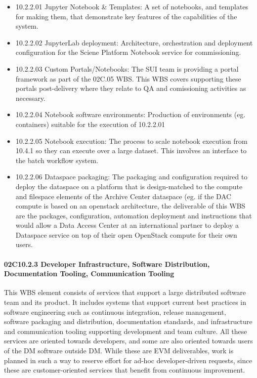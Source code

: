 \begin{itemize}

\item
  10.2.2.01 Jupyter Notebook \& Templates: A set of notebooks, and
  templates for making them, that demonstrate key features of the
  capabilities of the system. 
\item
  10.2.2.02 JupyterLab deployment: Architecture, orchestration and deployment configuration for the Sciene Platform Notebook service for commissioning.
  \item
  10.2.2.03 Custom Portals/Notebooks: The SUI team is providing a
  portal framework as part of the 02C.05 WBS. This WBS covers
  supporting these portals post-delivery where they relate to QA and
  comissioning activities as necessary.
\item
  10.2.2.04 Notebook software environments: Production of environments
  (eg. containers) suitable for the execution of 10.2.2.01
\item
  10.2.2.05 Notebook execution: The process to scale notebook execution
  from 10.4.1 so they can execute over a large dataset. This involves an interface to the batch workflow system.
\item
  10.2.2.06 Dataspace packaging: The packaging and configuration
  required to deploy the dataspace on a platform that is design-matched
  to the compute and filespace elements of the Archive Center dataspace
  (eg. if the DAC compute is based on an openstack architecture, the
  deliverable of this WBS are the packages, configuration, automation
  deployment and instructions that would allow a Data Access Center at
  an international partner to deploy a Dataspace service on top of their
  open OpenStack compute for their own users.

\end{itemize}

\paragraph{02C10.2.3 Developer Infrastructure, Software Distribution, Documentation Tooling, Communication Tooling}

This WBS element consists of services that support a large distributed
software team and its product. It includes systems that support current
best practices in software engineering such as continuous integration,
release management, software packaging and distribution, documentation
standards, and infrastructure and communication tooling supporting
development and team culture. All these services are oriented towards
developers, and some are also oriented towards users of the DM software
outside DM. While these are EVM deliverables, work is planned in such a
way to reserve effort for ad-hoc developer-driven requests, since these
are customer-oriented services that benefit from continuous improvement.


